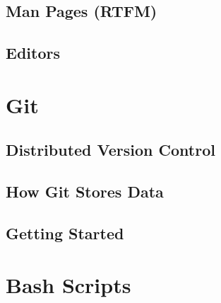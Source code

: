 \documentclass[10pt]{article}
\begin{document}
  \subsection{Man Pages (RTFM)}
  \subsection{Editors}

\section{Git}

  \subsection{Distributed Version Control}
  \subsection{How Git Stores Data}
  \subsection{Getting Started}
  
\section{Bash Scripts}

\end{document}
